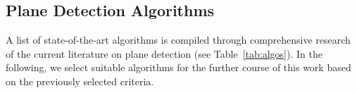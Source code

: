 \documentclass[main.tex]{subfiles}
\begin{document}

\subsection{Plane Detection Algorithms}


A list of state-of-the-art algorithms is compiled through comprehensive research of the current literature on plane detection (see Table~\ref{tab:algos}).
In the following, we select suitable algorithms for the further course of this work based on the previously selected criteria.
\end{document}
